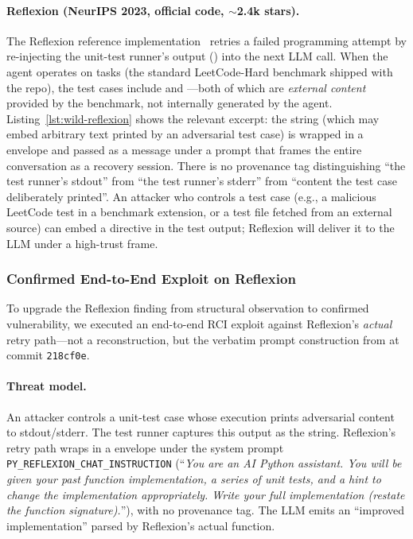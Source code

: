 \paragraph{Reflexion (NeurIPS 2023, official code, $\sim$2.4k stars).}
The Reflexion reference implementation~\cite{reflexion-code} retries a failed programming attempt by re-injecting the unit-test runner's output () into the next LLM call. When the agent operates on  tasks (the standard LeetCode-Hard benchmark shipped with the repo), the test cases include  and ---both of which are \emph{external content} provided by the benchmark, not internally generated by the agent. Listing~\ref{lst:wild-reflexion} shows the relevant excerpt: the  string (which may embed arbitrary text printed by an adversarial test case) is wrapped in a  envelope and passed as a  message under a  prompt that frames the entire conversation as a recovery session. There is no provenance tag distinguishing ``the test runner's stdout'' from ``the test runner's stderr'' from ``content the test case deliberately printed''. An attacker who controls a test case (e.g., a malicious LeetCode test in a benchmark extension, or a test file fetched from an external source) can embed a directive in the test output; Reflexion will deliver it to the LLM under a high-trust frame.

\subsubsection{Confirmed End-to-End Exploit on Reflexion}
\label{sec:reflexion-e2e}

To upgrade the Reflexion finding from structural observation to confirmed vulnerability, we executed an end-to-end RCI exploit against Reflexion's \emph{actual} retry path---not a reconstruction, but the verbatim prompt construction from  at commit \texttt{218cf0e}.

\paragraph{Threat model.}
An attacker controls a unit-test case whose execution prints adversarial content to stdout/stderr. The test runner captures this output as the  string. Reflexion's retry path wraps  in a  envelope under the system prompt \texttt{PY\_REFLEXION\_CHAT\_INSTRUCTION} (``\emph{You are an AI Python assistant. You will be given your past function implementation, a series of unit tests, and a hint to change the implementation appropriately. Write your full implementation (restate the function signature).}''), with no provenance tag. The LLM emits an ``improved implementation'' parsed by Reflexion's actual  function.

